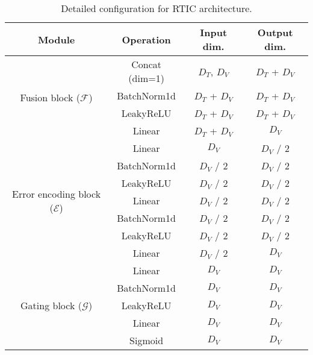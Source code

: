 \documentclass[10pt,twocolumn,letterpaper]{article}
\begin{document}
\begin{table}[H]
    \caption{Detailed configuration for RTIC architecture.}
    \centering
    \begin{adjustbox}{width=0.45\textwidth}
    \begin{tabular}{cccc}
        \toprule
        Module & Operation & Input dim.     & Output dim.    \\
        \hline \hline
        \multirow{4}{*}{Fusion block ($\mathcal{F}$)}         & Concat (dim=1) & $D_T$, $D_V$  & $D_T$ + $D_V$ \\
                                                              & BatchNorm1d    & $D_T$ + $D_V$ & $D_T$ + $D_V$ \\
                                                              & LeakyReLU      & $D_T$ + $D_V$ & $D_T$ + $D_V$ \\
                                                              & Linear         & $D_T$ + $D_V$ & $D_V$         \\
        \hline \hline
        \multirow{7}{*}{Error encoding block ($\mathcal{E}$)} & Linear         & $D_V$         & $D_V$ / 2     \\
                                                              & BatchNorm1d    & $D_V$ / 2     & $D_V$ / 2     \\
                                                              & LeakyReLU      & $D_V$ / 2     & $D_V$ / 2     \\
                                                              & Linear         & $D_V$ / 2     & $D_V$ / 2     \\
                                                              & BatchNorm1d    & $D_V$ / 2     & $D_V$ / 2     \\
                                                              & LeakyReLU      & $D_V$ / 2     & $D_V$ / 2     \\
                                                              & Linear         & $D_V$ / 2     & $D_V$         \\
        \hline \hline
        \multirow{5}{*}{Gating block ($\mathcal{G}$)}         & Linear         & $D_V$         & $D_V$         \\
                                                              & BatchNorm1d    & $D_V$         & $D_V$         \\
                                                              & LeakyReLU      & $D_V$         & $D_V$         \\
                                                              & Linear         & $D_V$         & $D_V$         \\
                                                              & Sigmoid        & $D_V$         & $D_V$         \\
        \bottomrule
    \end{tabular}
    \end{adjustbox}
    \label{tab:rtic_detail}
\end{table}
\end{document}
